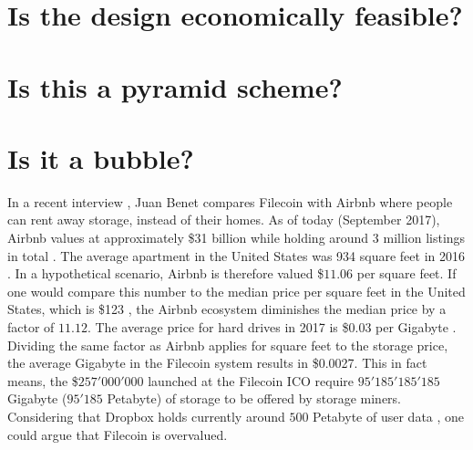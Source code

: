 \documentclass[journal]{IEEEtran}
\begin{document}
\section{Is the design economically feasible?}

\section{Is this a pyramid scheme?}

\section{Is it a bubble?}

In a recent interview \cite{podcast}, Juan Benet compares Filecoin with Airbnb \cite{airbnb} where people can rent away storage, instead of their homes.
As of today (September 2017), Airbnb values at approximately \$31 billion while holding around 3 million listings in total \cite{airbnb-valuation}.
The average apartment in the United States was 934 square feet in 2016 \cite{housing-cnbc}.
In a hypothetical scenario, Airbnb is therefore valued \$$11.06$ per square feet. 
If one would compare this number to the median price per square feet in the United States, which is \$123 \cite{home-prices}, the Airbnb ecosystem diminishes the median price by a factor of $11.12$.
The average price for hard drives in 2017 is \$0.03 per Gigabyte \cite{hard-drive}.
Dividing the same factor as Airbnb applies for square feet to the storage price, the average Gigabyte in the Filecoin system results in \$0.0027.
This in fact means, the \$$257'000'000$ launched at the Filecoin ICO require $95'185'185'185$ Gigabyte ($95'185$ Petabyte) of storage to be offered by storage miners.
Considering that Dropbox \cite{dropbox} holds currently around $500$ Petabyte of user data \cite{dropbox-userdata}, one could argue that Filecoin is overvalued.


\ifCLASSOPTIONcaptionsoff
  \newpage
\fi


\end{document}
